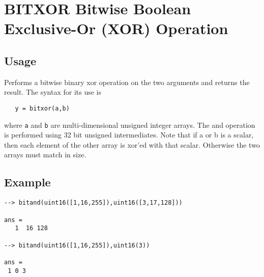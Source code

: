 \section{BITXOR Bitwise Boolean Exclusive-Or (XOR) Operation}

\subsection{Usage}

Performs a bitwise binary xor operation on the two arguments and
returns the result.  The syntax for its use is
\begin{verbatim}
   y = bitxor(a,b)
\end{verbatim}
where \verb|a| and \verb|b| are multi-dimensional unsigned integer arrays.
The and operation is performed using 32 bit unsigned intermediates.  Note that if a
or b is a scalar, then each element of the other array is xor'ed with
 that scalar.  Otherwise the two arrays must match in size.
\subsection{Example}

\begin{verbatim}
--> bitand(uint16([1,16,255]),uint16([3,17,128]))

ans = 
   1  16 128 

--> bitand(uint16([1,16,255]),uint16(3))

ans = 
 1 0 3 
\end{verbatim}
